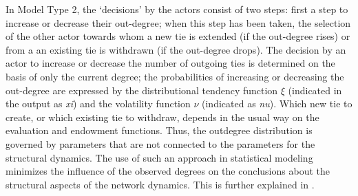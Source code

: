 \documentclass[a4paper,fleqn]{article}
\newcommand{\+}{\, + \,}
\newcommand{\SI}{{\sf SIENA }}
\newcommand{\si}{{\sf SIENA}}
\begin{document}
{

\iffalse
In Model Type 2, the `decisions' by the actors
consist of two steps: first a step to increase or decrease their
out-degree; when this step has been taken, the selection of the
other actor towards whom a new tie is extended (if the out-degree
rises) or from a an existing tie is withdrawn (if the out-degree
drops).
The decision by an actor to increase or decrease the number of outgoing ties
is determined on the basis
of only the current degree; the probabilities of increasing or
decreasing the out-degree are expressed by the distributional
tendency function $\xi$ (indicated in the output as \emph{xi}) and
the volatility function $\nu$ (indicated as \emph{nu}). Which new
tie to create, or which existing tie to withdraw, depends in the
usual way on the evaluation and endowment functions. Thus, the
outdegree distribution is governed by parameters that are not
connected to the parameters for the structural dynamics. The use of
such an approach in statistical modeling minimizes the influence of
the observed degrees on the conclusions about the structural aspects
of the network dynamics. This is further explained in \citet{Snijders03}.

}
\end{document}
